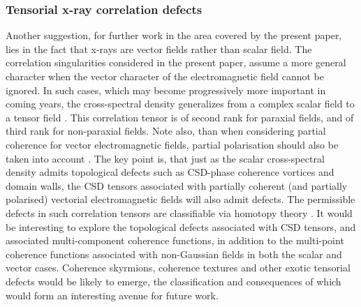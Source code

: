 \documentclass[%
 reprint,
 amsmath,amssymb,
 aps,
]{revtex4-1}
\begin{document}
\subsubsection{Tensorial x-ray correlation defects} Another suggestion, for further work in the area covered by the present paper, lies in the fact that x-rays are vector fields rather than scalar field.  The correlation singularities considered in the present paper, assume a more general character when the vector character of the electromagnetic field cannot be ignored.  In such cases, which may become progressively more important in coming years, the cross-spectral density generalizes from a complex scalar field to a tensor field \cite{mandel_wolf,wolf_thin_book}.  This correlation tensor is of second rank for paraxial fields, and of third rank for non-paraxial fields.  Note also, than when considering partial coherence for vector electromagnetic fields, partial polarisation should also be taken into account \cite{wolf_thin_book}.  The key point is, that just as the scalar cross-spectral density admits topological defects such as CSD-phase coherence vortices and domain walls, the CSD tensors associated with partially coherent (and partially polarised) vectorial electromagnetic fields will also admit defects.  The permissible defects in such correlation tensors are classifiable via homotopy theory \cite{VilenkinShellard1994,Volovik2003}.  It would be interesting to explore the topological defects associated with CSD tensors, and associated multi-component coherence functions, in addition to the multi-point coherence functions associated with non-Gaussian fields in both the scalar and vector cases.  Coherence skyrmions, coherence textures and other exotic tensorial defects would be likely to emerge, the classification and consequences of which would form an interesting avenue for future work.
\end{document}
